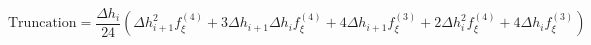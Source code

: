 \begin{equation} 
\text{Truncation} = \frac{\Delta h_{{i}}}{24} \left(\Delta h_{{i+1}}^{2} f^{{(4)}}_{{\xi}} + 3 \Delta h_{{i+1}} \Delta h_{{i}} f^{{(4)}}_{{\xi}} + 4 \Delta h_{{i+1}} f^{{(3)}}_{{\xi}} + 2 \Delta h_{{i}}^{2} f^{{(4)}}_{{\xi}} + 4 \Delta h_{{i}} f^{{(3)}}_{{\xi}}\right)
 \end{equation}